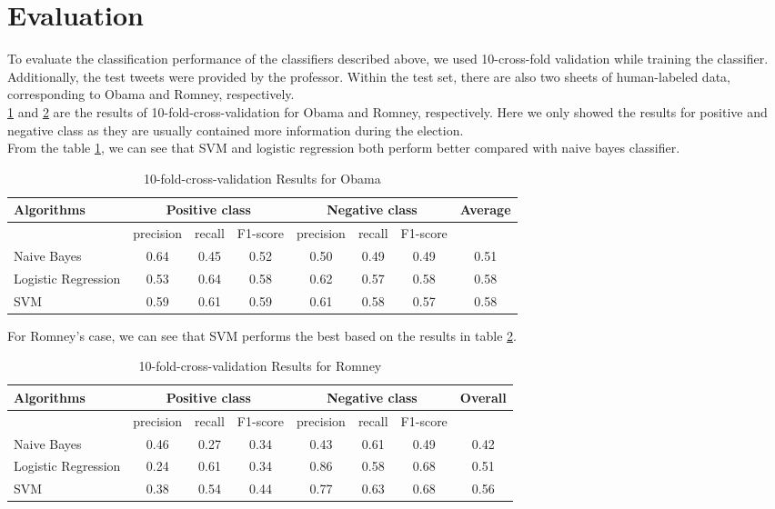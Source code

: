 \documentclass[paper=a4, fontsize=12pt]{scrartcl}
\numberwithin{equation}{section}
\numberwithin{figure}{section}
\numberwithin{table}{section}
\begin{document}
\section{Evaluation}
To evaluate the classification performance of the classifiers described above, we used 10-cross-fold validation while training the classifier. Additionally, the test tweets were provided by the professor. Within the test set, there are also two sheets of human-labeled data, corresponding to Obama and Romney, respectively. \\[5pt]
\ref{table:table 1} and \ref{table:table 2} are the results of 10-fold-cross-validation for Obama and Romney, respectively. Here we only showed the results for positive and negative class as they are usually contained more information during the election. \\[5pt]
From the table \ref{table:table 1}, we can see that SVM and logistic regression both perform better compared with naive bayes classifier. 
\begin{table}[H]
\begin{tabular}{|p{4cm}|c c c| c c c| c|}
\hline Algorithms&\multicolumn{3}{|c|}{Positive class} & \multicolumn{3}{c|}{Negative class} & Average\\
\hline
& precision & recall & F1-score  & precision & recall & F1-score  &\\
\hline
Naive Bayes & 0.64 & 0.45 & 0.52& 0.50 & 0.49 &0.49 & 0.51\\
\hline
Logistic Regression& 0.53 &  0.64& 0.58 &  0.62&  0.57 & 0.58 &  0.58\\
\hline
SVM& 0.59 &  0.61 & 0.59 & 0.61 & 0.58 &  0.57 &  0.58\\
\hline
\end{tabular}
\caption{10-fold-cross-validation Results for Obama}\label{table:table 1}
\end{table}
For Romney's case, we can see that SVM performs the best based on the results in table \ref{table:table 2}. 
\begin{table}[H]
\begin{tabular}{|p{4cm}|c c c| c c c| c|}
\hline Algorithms&\multicolumn{3}{|c|}{Positive class} & \multicolumn{3}{c|}{Negative class} & Overall\\
\hline
& precision & recall & F1-score  & precision & recall & F1-score  &\\
\hline
Naive Bayes & 0.46 &0.27  & 0.34  &0.43  & 0.61 & 0.49 & 0.42\\
\hline
Logistic Regression & 0.24  &0.61  &0.34  & 0.86  & 0.58 & 0.68 &0.51\\
\hline
SVM&  0.38 &  0.54 &  0.44 &   0.77 &  0.63 & 0.68 &  0.56\\
\hline
\end{tabular}
\caption{10-fold-cross-validation Results for Romney}\label{table:table 2}
\end{table}
\end{document}
